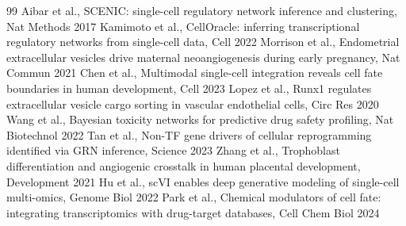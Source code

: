 \documentclass[11pt,a4paper]{article}
\begin{document}

\begin{thebibliography}{99}
 Aibar et al., SCENIC: single-cell regulatory network inference and clustering, Nat Methods 2017
 Kamimoto et al., CellOracle: inferring transcriptional regulatory networks from single-cell data, Cell 2022
 Morrison et al., Endometrial extracellular vesicles drive maternal neoangiogenesis during early pregnancy, Nat Commun 2021
 Chen et al., Multimodal single-cell integration reveals cell fate boundaries in human development, Cell 2023
 Lopez et al., Runx1 regulates extracellular vesicle cargo sorting in vascular endothelial cells, Circ Res 2020
 Wang et al., Bayesian toxicity networks for predictive drug safety profiling, Nat Biotechnol 2022
 Tan et al., Non-TF gene drivers of cellular reprogramming identified via GRN inference, Science 2023
 Zhang et al., Trophoblast differentiation and angiogenic crosstalk in human placental development, Development 2021
 Hu et al., scVI enables deep generative modeling of single-cell multi-omics, Genome Biol 2022
 Park et al., Chemical modulators of cell fate: integrating transcriptomics with drug-target databases, Cell Chem Biol 2024
\end{thebibliography}
\end{document}
